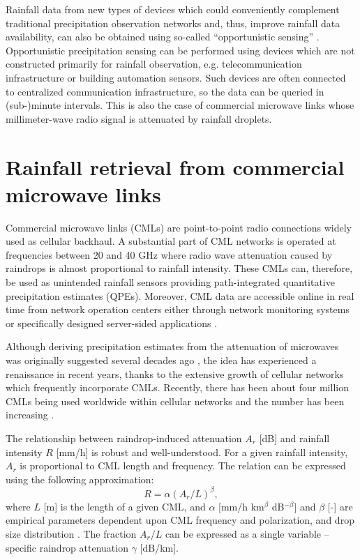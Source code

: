 \documentclass{ctuthesis}\usepackage[]{graphicx}\usepackage[]{color}
\begin{document}
Rainfall data from new types of devices which could conveniently complement traditional precipitation observation networks and, thus, improve rainfall data availability, can also be obtained using so-called \enquote{opportunistic sensing} \citep{tauroMeasurementsObservationsXXI2018}. Opportunistic precipitation sensing can be performed using devices which are not constructed primarily for rainfall observation, e.g. telecommunication infrastructure or building automation sensors. Such devices are often connected to centralized communication infrastructure, so the data can be queried in (sub-)minute intervals. This is also the case of commercial microwave links whose millimeter-wave radio signal is attenuated by rainfall droplets.


\section{Rainfall retrieval from commercial microwave links}

Commercial microwave links (CMLs) are point-to-point radio connections widely used as cellular backhaul. A substantial part of CML networks is operated at frequencies between 20 and 40 GHz where radio wave attenuation caused by raindrops is almost proportional to rainfall intensity. These CMLs can, therefore, be used as unintended rainfall sensors providing path-integrated quantitative precipitation estimates (QPEs). Moreover, CML data are accessible online in real time from network operation centers either through network monitoring systems or specifically designed server-sided applications \citep{chwalaRealtimeDataAcquisition2016}.

Although deriving precipitation estimates from the attenuation of microwaves was originally suggested several decades ago \citep{atlasPathAreaIntegratedRainfall1977}, the idea has experienced a renaissance in recent years, thanks to the extensive growth of cellular networks \citep{messer2006environmental, leijnseRainfallMeasurementUsing2007} which frequently incorporate CMLs. Recently, there has been about four million CMLs being used worldwide within cellular networks and the number has been increasing \citep{ericssonEricssonMicrowaveOutlook2016}.

The relationship between raindrop-induced attenuation $A_r$ [dB] and rainfall intensity $R$ [mm/h] is robust and well-understood. For a given rainfall intensity, $A_r$ is proportional to CML length and frequency. The relation can be expressed using the following approximation:
        \begin{equation} \label{eq:2eq1}
        R = \alpha (A_r / L)^\beta,
        \end{equation}
where $L$ [m] is the length of a given CML, and $\alpha$ [mm/h km$^\beta$ dB$^{-\beta}$] and $\beta$ [-] are empirical parameters dependent upon CML frequency and polarization, and drop size distribution \citep{olsenARbRelationCalculation1978}. The fraction $A_r / L$ can be expressed as a single variable -- specific raindrop attenuation $\gamma$ [dB/km].
\end{document}
